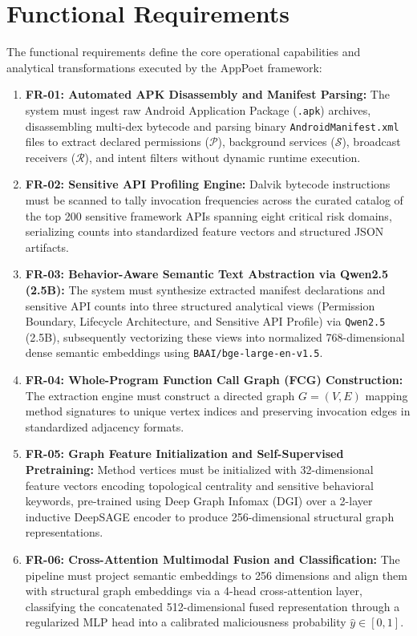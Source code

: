 \documentclass[12pt,a4paper,oneside]{report}
\begin{document}
\section{Functional Requirements}
The functional requirements define the core operational capabilities and analytical transformations executed by the AppPoet framework:
\begin{enumerate}
    \item \textbf{FR-01: Automated APK Disassembly and Manifest Parsing:} The system must ingest raw Android Application Package (\texttt{.apk}) archives, disassembling multi-dex bytecode and parsing binary \texttt{AndroidManifest.xml} files to extract declared permissions ($\mathcal{P}$), background services ($\mathcal{S}$), broadcast receivers ($\mathcal{R}$), and intent filters without dynamic runtime execution.
    \item \textbf{FR-02: Sensitive API Profiling Engine:} Dalvik bytecode instructions must be scanned to tally invocation frequencies across the curated catalog of the top 200 sensitive framework APIs spanning eight critical risk domains, serializing counts into standardized feature vectors and structured JSON artifacts.
    \item \textbf{FR-03: Behavior-Aware Semantic Text Abstraction via Qwen2.5 (2.5B):} The system must synthesize extracted manifest declarations and sensitive API counts into three structured analytical views (Permission Boundary, Lifecycle Architecture, and Sensitive API Profile) via \texttt{Qwen2.5} (2.5B), subsequently vectorizing these views into normalized 768-dimensional dense semantic embeddings using \texttt{BAAI/bge-large-en-v1.5}.
    \item \textbf{FR-04: Whole-Program Function Call Graph (FCG) Construction:} The extraction engine must construct a directed graph $G = (V, E)$ mapping method signatures to unique vertex indices and preserving invocation edges in standardized adjacency formats.
    \item \textbf{FR-05: Graph Feature Initialization and Self-Supervised Pretraining:} Method vertices must be initialized with 32-dimensional feature vectors encoding topological centrality and sensitive behavioral keywords, pre-trained using Deep Graph Infomax (DGI) over a 2-layer inductive DeepSAGE encoder to produce 256-dimensional structural graph representations.
    \item \textbf{FR-06: Cross-Attention Multimodal Fusion and Classification:} The pipeline must project semantic embeddings to 256 dimensions and align them with structural graph embeddings via a 4-head cross-attention layer, classifying the concatenated 512-dimensional fused representation through a regularized MLP head into a calibrated maliciousness probability $\hat{y} \in [0, 1]$.
\end{enumerate}
\end{document}
